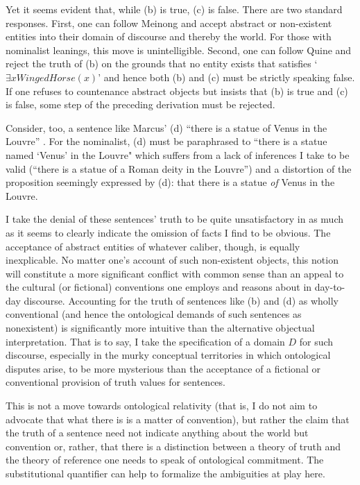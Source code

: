\documentclass[12pt,a4paper]{article}
\begin{document}
Yet it seems evident that, while (b) is true, (c) is false.  There are
two standard responses.  First, one can follow Meinong and accept
abstract or non-existent entities into their domain of discourse and
thereby the world.  For those with nominalist leanings, this move is
unintelligible.  Second, one can follow Quine and reject the truth of
(b) on the grounds that no entity exists that satisfies `$\exists
xWingedHorse(x)$' and hence both (b) and (c) must be strictly speaking
false.  If one refuses to countenance abstract objects but insists
that (b) is true and (c) is false, some step of the preceding
derivation must be rejected.

Consider, too, a sentence like Marcus' (d) ``there is a statue of
Venus in the Louvre'' \cite{marcus72}.  For the nominalist, (d) must
be paraphrased to ``there is a statue named `Venus' in the Louvre"
which suffers from a lack of inferences I take to be valid (``there is
a statue of a Roman deity in the Louvre'') and a distortion of the
proposition seemingly expressed by (d): that there is a statue
\emph{of} Venus in the Louvre.

I take the denial of these sentences' truth to be quite unsatisfactory
in as much as it seems to clearly indicate the omission of facts I
find to be obvious.  The acceptance of abstract entities of whatever
caliber, though, is equally inexplicable.  No matter one's account of
such non-existent objects, this notion will constitute a more
significant conflict with common sense than an appeal to the cultural
(or fictional) conventions one employs and reasons about in day-to-day
discourse. Accounting for the truth of sentences like (b) and (d) as
wholly conventional (and hence the ontological demands of such
sentences as nonexistent) is significantly more intuitive than the
alternative objectual interpretation.  That is to say, I take the
specification of a domain $D$ for such discourse, especially in the
murky conceptual territories in which ontological disputes arise, to
be more mysterious than the acceptance of a fictional or conventional
provision of truth values for sentences.

This is not a move towards ontological relativity (that is, I do not
aim to advocate that what there is is a matter of convention), but
rather the claim that the truth of a sentence need not indicate
anything about the world but convention or, rather, that there is a
distinction between a theory of truth and the theory of reference one
needs to speak of ontological commitment.  The substitutional
quantifier can help to formalize the ambiguities at play here.
\end{document}
